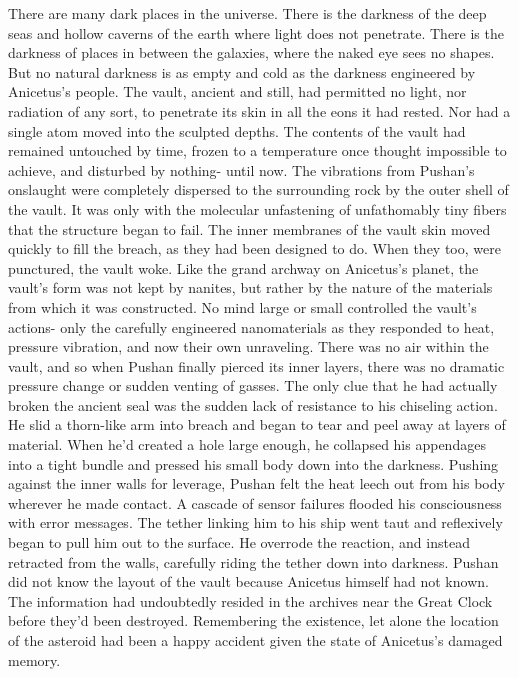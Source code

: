 \documentclass[a4paper]{article}
\begin{document}
There are many dark places in the universe. There is the darkness of the deep seas and hollow caverns of the earth where light does not penetrate. There is the darkness of places in between the galaxies, where the naked eye sees no shapes. But no natural darkness is as empty and cold as the darkness engineered by Anicetus’s people.
The vault, ancient and still, had permitted no light, nor radiation of any sort, to penetrate its skin in all the eons it had rested. Nor had a single atom moved into the sculpted depths. The contents of the vault had remained untouched by time, frozen to a temperature once thought impossible to achieve, and disturbed by nothing- until now.
The vibrations from Pushan’s onslaught were completely dispersed to the surrounding rock by the outer shell of the vault. It was only with the molecular unfastening of unfathomably tiny fibers that the structure began to fail. The inner membranes of the vault skin moved quickly to fill the breach, as they had been designed to do. When they too, were punctured, the vault woke.
Like the grand archway on Anicetus’s planet, the vault’s form was not kept by nanites, but rather by the nature of the materials from which it was constructed. No mind large or small controlled the vault’s actions- only the carefully engineered nanomaterials as they responded to heat, pressure vibration, and now their own unraveling.
There was no air within the vault, and so when Pushan finally pierced its inner layers, there was no dramatic pressure change or sudden venting of gasses. The only clue that he had actually broken the ancient seal was the sudden lack of resistance to his chiseling action. He slid a thorn-like arm into breach and began to tear and peel away at layers of material. When he’d created a hole large enough, he collapsed his appendages into a tight bundle and pressed his small body down into the darkness.
Pushing against the inner walls for leverage, Pushan felt the heat leech out from his body wherever he made contact. A cascade of sensor failures flooded his consciousness with error messages. The tether linking him to his ship went taut and reflexively began to pull him out to the surface. He overrode the reaction, and instead retracted from the walls, carefully riding the tether down into darkness.
Pushan did not know the layout of the vault because Anicetus himself had not known. The information had undoubtedly resided in the archives near the Great Clock before they’d been destroyed. Remembering the existence, let alone the location of the asteroid had been a happy accident given the state of Anicetus’s damaged memory.
\end{document}
